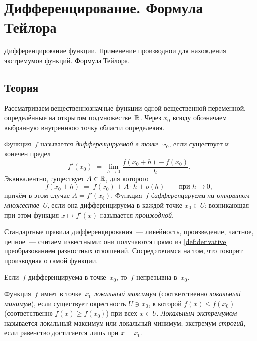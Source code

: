 
\section{Дифференцирование. Формула Тейлора}
\label{sec:1.1.09-derivatives-taylor}

\begin{ticket}
Дифференцирование функций. Применение производной для нахождения экстремумов функций. Формула Тейлора.
\end{ticket}

\subsection*{Теория}

Рассматриваем вещественнозначные функции одной вещественной переменной,
определённые на открытом подмножестве~$\mathbb{R}$. Через $x_0$ всюду
обозначаем выбранную внутреннюю точку области определения.

\begin{definition}
\label{def:derivative}
Функция~$f$ называется \emph{дифференцируемой в точке~$x_0$}, если
существует и конечен предел
\[
  f'(x_0) \;=\; \lim_{h \to 0} \frac{f(x_0 + h) - f(x_0)}{h}.
\]
Эквивалентно, существует $A \in \mathbb{R}$, для которого
\[
  f(x_0 + h) \;=\; f(x_0) + A \cdot h + o(h)
  \qquad \text{при } h \to 0,
\]
причём в этом случае $A = f'(x_0)$. Функция~$f$ \emph{дифференцируема
на открытом множестве~$U$}, если она дифференцируема в каждой точке
$x_0 \in U$; возникающая при этом функция $x \mapsto f'(x)$ называется
\emph{производной}.
\end{definition}

Стандартные правила дифференцирования~--- линейность, произведение,
частное, цепное~--- считаем известными; они получаются прямо из
\cref{def:derivative} преобразованием разностных отношений.
Сосредоточимся на том, что говорит производная о самой функции.

\begin{proposition}
\label{prop:diff-implies-cont}
Если~$f$ дифференцируема в точке~$x_0$, то~$f$ непрерывна в~$x_0$.
\end{proposition}

\begin{definition}
\label{def:local-extremum}
Функция~$f$ имеет в точке~$x_0$ \emph{локальный максимум} (соответственно
\emph{локальный минимум}), если существует окрестность $U \ni x_0$, в
которой $f(x) \le f(x_0)$ (соответственно $f(x) \ge f(x_0)$) при всех
$x \in U$. \emph{Локальным экстремумом} называется локальный максимум
или локальный минимум; экстремум \emph{строгий}, если равенство
достигается лишь при $x = x_0$.
\end{definition}

